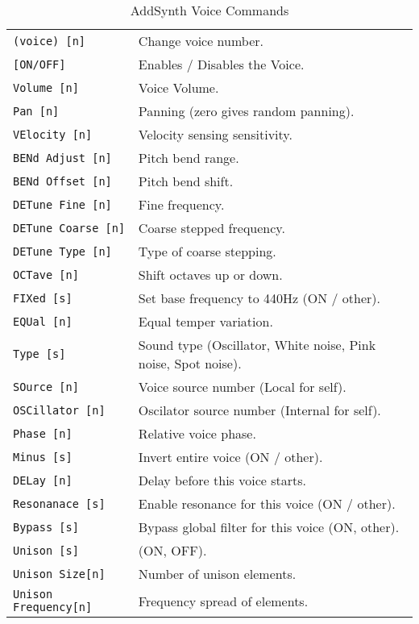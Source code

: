    \begin{table}[H]
      \caption{AddSynth Voice Commands}
      \label{table:yoshimi_part_addsynth_voice_commands}
      \begin{tabular}{l l}
\texttt{(voice) [n]} &
   Change voice number.  \\
\texttt{[ON/OFF]} &
   Enables / Disables the Voice. \\
\texttt{Volume [n]} &
   Voice Volume.  \\
\texttt{Pan [n]} &
   Panning (zero gives random panning).\\
\texttt{VElocity [n]} &
   Velocity sensing sensitivity. \\
\texttt{BENd Adjust [n]} &
   Pitch bend range. \\
\texttt{BENd Offset [n]} &
   Pitch bend shift. \\
\texttt{DETune Fine [n]} &
   Fine frequency.   \\
\texttt{DETune Coarse [n]} &
   Coarse stepped frequency.  \\
\texttt{DETune Type [n]} &
   Type of coarse stepping.   \\
\texttt{OCTave [n]} &
   Shift octaves up or down.  \\
\texttt{FIXed [s]} &
   Set base frequency to 440Hz (ON / other).  \\
\texttt{EQUal [n]} &
   Equal temper variation. \\
\texttt{Type [s]} &
   Sound type (Oscillator, White noise, Pink noise, Spot noise). \\
\texttt{SOurce [n]} &
   Voice source number (Local for self). \\
\texttt{OSCillator [n]} &
   Oscilator source number (Internal for self). \\
\texttt{Phase [n]} &
   Relative voice phase. \\
\texttt{Minus [s]} &
   Invert entire voice (ON / other). \\
\texttt{DELay [n]} &
   Delay before this voice starts. \\
\texttt{Resonanace [s]} &
   Enable resonance for this voice (ON / other). \\
\texttt{Bypass [s]} &
   Bypass global filter for this voice (ON, {other}). \\
\texttt{Unison [s]} &
   (ON, OFF). \\
\texttt{Unison Size[n]} &
   Number of unison elements. \\
\texttt{Unison Frequency[n]} &
   Frequency spread of elements. \\

\end{tabular}
\end{table}
